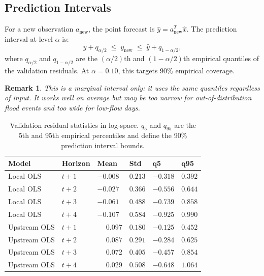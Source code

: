 \documentclass[10pt, twocolumn]{article}
\newtheorem{remark}{Remark}
\begin{document}
\subsection{Prediction Intervals}

For a new observation $a_{\text{new}}$, the point forecast is $\hat{y} = a_{\text{new}}^T \hat{x}$.
The prediction interval at level $\alpha$ is:
\[
  \hat{y} + q_{\alpha/2} \;\leq\; y_{\text{new}} \;\leq\; \hat{y} + q_{1-\alpha/2},
\]
where $q_{\alpha/2}$ and $q_{1-\alpha/2}$ are the $(\alpha/2)$th and $(1-\alpha/2)$th
empirical quantiles of the validation residuals.
At $\alpha = 0.10$, this targets 90\% empirical coverage.

\begin{remark}
This is a marginal interval only: it uses the same quantiles regardless of input.
It works well on average but may be too narrow for out-of-distribution flood events
and too wide for low-flow days.
\end{remark}

\begin{table}[h]
\centering
\caption{Validation residual statistics in log-space. $q_5$ and $q_{95}$ are the
  5th and 95th empirical percentiles and define the 90\% prediction interval bounds.}
\label{tab:val_residuals}
\footnotesize
\begin{tabularx}{\columnwidth}{@{}lXXXXX@{}}
\toprule
\textbf{Model} & \textbf{Horizon} & \textbf{Mean} & \textbf{Std} & \textbf{q5} & \textbf{q95} \\
\midrule
Local OLS    & $t{+}1$ & $-0.008$ & $0.213$ & $-0.318$ & $0.392$ \\
Local OLS    & $t{+}2$ & $-0.027$ & $0.366$ & $-0.556$ & $0.644$ \\
Local OLS    & $t{+}3$ & $-0.061$ & $0.488$ & $-0.739$ & $0.858$ \\
Local OLS    & $t{+}4$ & $-0.107$ & $0.584$ & $-0.925$ & $0.990$ \\
\midrule
Upstream OLS & $t{+}1$ & $\phantom{-}0.097$ & $0.180$ & $-0.125$ & $0.452$ \\
Upstream OLS & $t{+}2$ & $\phantom{-}0.087$ & $0.291$ & $-0.284$ & $0.625$ \\
Upstream OLS & $t{+}3$ & $\phantom{-}0.072$ & $0.405$ & $-0.457$ & $0.854$ \\
Upstream OLS & $t{+}4$ & $\phantom{-}0.029$ & $0.508$ & $-0.648$ & $1.064$ \\
\bottomrule
\end{tabularx}
\end{table}
\end{document}
